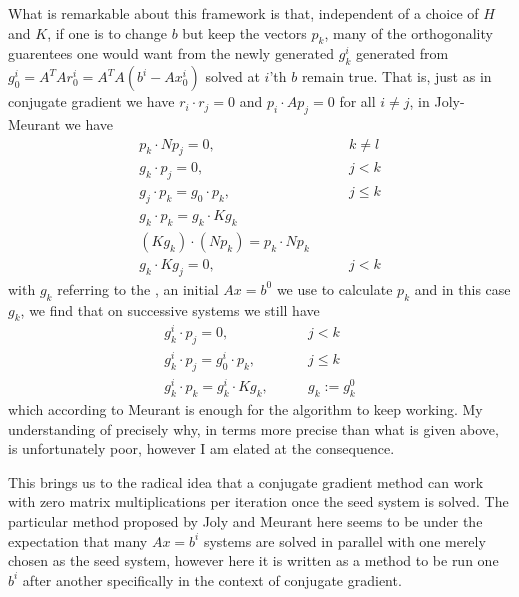 \documentclass[11pt]{article}
\begin{document}
What is remarkable about this framework is that, independent of a choice of $H$ and $K$, if one is to change $b$ but keep the vectors $p_k$, many of the orthogonality guarentees one would want from the newly generated $g_k^i$ generated from $g_0^i = A^T A r_0^i = A^T A (b^i - Ax_0^i)$ solved at $i$'th $b$ remain true. That is, just as in conjugate gradient we have $r_i \cdot r_j = 0 $ and $p_i \cdot A p_j = 0$ for all $i \neq j$, in Joly-Meurant we have \begin{align*}
p_k \cdot N p_j = 0, \hspace{2em} &k \neq l \\
g_k \cdot p_j = 0, \hspace{2em} &j < k \\
g_j \cdot p_k = g_0 \cdot p_k, \hspace{2em} &j \le k \\
g_k \cdot p_k = g_k \cdot K g_k \hspace{2em} & \\
(K g_k) \cdot (Np_k) = p_k \cdot N p_k \hspace{2em} & \\
g_k \cdot K g_j = 0, \hspace{2em} & j < k 
\end{align*}
with $g_k$ referring to the , an initial $Ax = b^0$ we use to calculate $p_k$ and in this case $g_k$, we find that on successive systems we still have \begin{align*}
g_k^i \cdot p_j = 0, \hspace{2em} & j < k \\
g_k^i \cdot p_j = g_0^i \cdot p_k , \hspace{2em} & j \le k\\
g_k^i \cdot p_k = g_k^i \cdot K g_k, \hspace{2em} &  g_k := g_k^0
\end{align*}
which according to Meurant is enough for the algorithm to keep working. My understanding of precisely why, in terms more precise than what is given above, is unfortunately poor, however I am elated at the consequence.

This brings us to the radical idea that a conjugate gradient method can work with zero matrix multiplications per iteration once the seed system is solved. The particular method proposed by Joly and Meurant here seems to be under the expectation that many $Ax = b^i$ systems are solved in parallel with one merely chosen as the seed system, however here it is written as a method to be run one $b^i$ after another specifically in the context of conjugate gradient.
\end{document}
